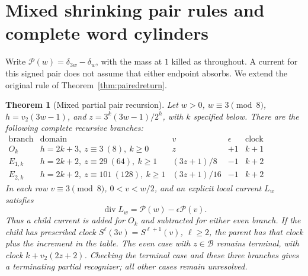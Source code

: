 \documentclass[11pt]{article}
\newtheorem{theorem}{Theorem}
\begin{document}
\section{Mixed shrinking pair rules and complete word cylinders}
Write $\mathcal P(w)=\delta_{3w}-\delta_w$, with the mass at $1$
killed as throughout. A current for this signed pair does not assume
that either endpoint absorbs. We extend the original rule of
Theorem~\ref{thm:pairedreturn}.

\begin{theorem}[Mixed partial pair recursion]\label{thm:mixedpairs}
Let $w>0$, $w\equiv3\pmod8$, $h=v_2(3w-1)$, and
$z=3^k(3w-1)/2^h$, with $k$ specified below. There are the following
complete recursive branches:
\[
\begin{array}{c|c|c|c|c}
\text{branch}&\text{domain}&v&\epsilon&\text{clock increment}\\\hline
O_k&h=2k+3,\ z\equiv3\ (8),\ k\ge0&z&+1&k+1\\
E_{1,k}&h=2k+2,\ z\equiv29\ (64),\ k\ge1&(3z+1)/8&-1&k+2\\
E_{2,k}&h=2k+2,\ z\equiv101\ (128),\ k\ge1&(3z+1)/16&-1&k+2
\end{array}
\]
In each row $v\equiv3\pmod8$, $0<v<w/2$, and an explicit local
current $L_w$ satisfies
\[
\operatorname{div}L_w=\mathcal P(w)-\epsilon\mathcal P(v).
\]
Thus a child current is added for $O_k$ and subtracted for either
even branch. If the child has prescribed clock
$S^\ell(3v)=S^{\ell+1}(v)$, $\ell\ge2$, the parent has that clock
plus the increment in the table. The even case with $z\in\mathcal B$
remains terminal, with clock $k+v_2(2z+2)$. Checking the terminal
case and these three branches gives a terminating partial recognizer;
all other cases remain unresolved.
\end{theorem}
\end{document}
